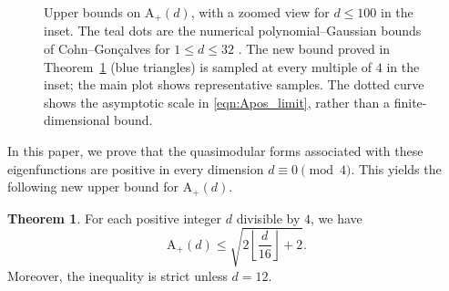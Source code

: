 \documentclass[10pt,reqno]{amsproc}
\newcommand{\rA}{\mathrm{A}}
\newcommand{\1}{\mathds{1}}	%
\theoremstyle{definition}
\newtheorem{theorem}{Theorem}[section]
\theoremstyle{remark}
\begin{document}
\begin{figure}[t]
\caption{Upper bounds on $\rA_+(d)$, with a zoomed view for $d \le 100$ in the inset. The teal dots are the numerical polynomial--Gaussian bounds of Cohn--Gon{\c{c}}alves for $1\le d\le32$ \cite[Table 2]{cohn2019optimal}. The new bound proved in Theorem~\ref{thm:main} (blue triangles) is sampled at every multiple of $4$ in the inset; the main plot shows representative samples.
The dotted curve shows the asymptotic scale in \eqref{eqn:Apos_limit}, rather than a finite-dimensional bound.}
\label{fig:bounds_Aplus}
\end{figure}


In this paper, we prove that the quasimodular forms associated with these eigenfunctions are positive in every dimension $d \equiv 0 \pmod{4}$. This yields the following new upper bound for $\rA_+(d)$.

\begin{theorem}
\label{thm:main}
For each positive integer $d$ divisible by $4$, we have
\begin{equation}
    \label{eqn:main}
    \rA_+(d) \le \sqrt{2 \left\lfloor \frac{d}{16} \right\rfloor + 2}.
\end{equation}
Moreover, the inequality is strict unless $d = 12$.
\end{theorem}
\end{document}
